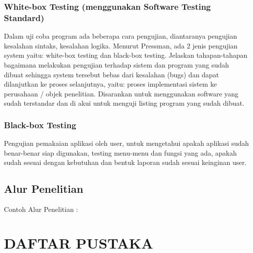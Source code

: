\documentclass[oneside,listof=totoc]{scrbook}
\begin{document}
\subsection{White-box Testing (menggunakan Software Testing Standard)}
Dalam uji coba program ada beberapa cara pengujian, diantaranya pengujian kesalahan sintaks, kesalahan logika. Menurut Pressman, ada 2 jenis pengujian system yaitu: white-box testing dan black-box testing. Jelaskan tahapan-tahapan bagaimana melakukan pengujian terhadap sistem dan program yang sudah dibuat sehingga system tersebut bebas dari kesalahan (bugs) dan dapat dilanjutkan ke proses selanjutnya, yaitu: proses implementasi sistem ke perusahaan / objek penelitian. Disarankan untuk menggunakan software yang sudah terstandar dan di akui untuk menguji listing program yang sudah dibuat.

\subsection{Black-box Testing}
Pengujian pemakaian aplikasi oleh user, untuk mengetahui apakah aplikasi sudah benar-benar siap digunakan, testing menu-menu dan fungsi yang ada, apakah sudah sesuai dengan kebutuhan dan bentuk laporan sudah sesuai keinginan user.

\section{Alur Penelitian}
Contoh Alur Penelitian :


\backmatter
\pagestyle{plain}

\chapter{DAFTAR PUSTAKA}

\vspace{0.5cm}
\end{document}
